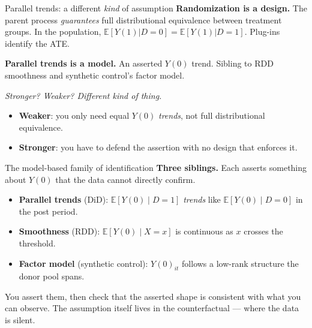 \documentclass[aspectratio=169,11pt]{beamer}
\begin{document}
\begin{frame}{Parallel trends: a different \textit{kind} of assumption}
\footnotesize
\textbf{Randomization is a design.} \;The parent process \textit{guarantees} full distributional equivalence between treatment groups. \;In the population, $\mathbb{E}[Y(1)|D{=}0] = \mathbb{E}[Y(1)|D{=}1]$. \;Plug-ins identify the ATE.

\vspace{0.6em}
\textbf{Parallel trends is a model.} \;An asserted $Y(0)$ trend. \;Sibling to RDD smoothness and synthetic control's factor model. \;

\vspace{0.7em}
\textit{Stronger? Weaker? \;Different kind of thing.}
\begin{itemize}\setlength\itemsep{3pt}
  \item \textbf{Weaker}: you only need equal $Y(0)$ \textit{trends}, not full distributional equivalence.
  \item \textbf{Stronger}: you have to defend the assertion with no design that enforces it.
\end{itemize}

\vspace{0.4em}
\end{frame}

\begin{frame}{The model-based family of identification}
\footnotesize
\textbf{Three siblings.} \;Each asserts something about $Y(0)$ that the data cannot directly confirm.

\vspace{0.7em}
\begin{itemize}\setlength\itemsep{5pt}
  \item \textbf{Parallel trends} (DiD): \;$\mathbb{E}[Y(0) \mid D{=}1]$ \textit{trends} like $\mathbb{E}[Y(0) \mid D{=}0]$ in the post period.
  \item \textbf{Smoothness} (RDD): \;$\mathbb{E}[Y(0) \mid X{=}x]$ is continuous as $x$ crosses the threshold.
  \item \textbf{Factor model} (synthetic control): \;$Y(0)_{it}$ follows a low-rank structure the donor pool spans.
\end{itemize}

\vspace{0.7em}
 \;You assert them, then check that the asserted shape is consistent with what you can observe. \;The assumption itself lives in the counterfactual --- where the data is silent.
\end{frame}
\end{document}
